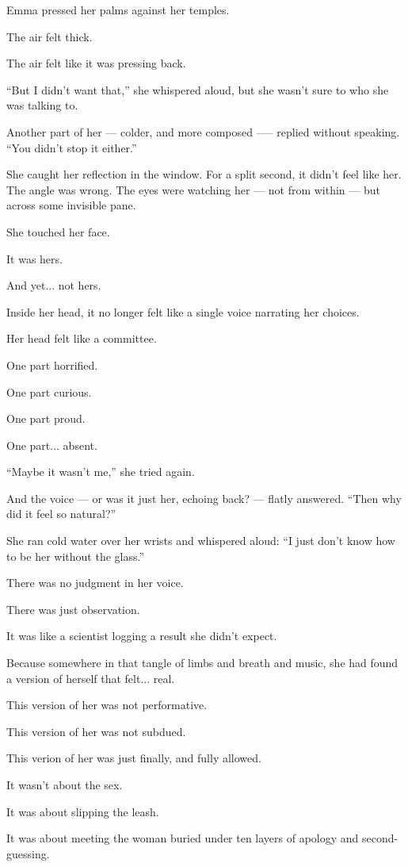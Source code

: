 Emma pressed her palms against her temples. 

The air felt thick. 

The air felt like it was pressing back.

``But I didn’t want that,'' she whispered aloud, but she wasn’t sure to who she was talking to.

Another part of her --- colder, and more composed —-- replied without speaking.
``You didn’t stop it either.''

She caught her reflection in the window. For a split second, it didn’t feel like her. The angle was 
wrong. The eyes were watching her --- not from within --- but across some invisible pane.

She touched her face. 

It was hers. 

And yet... not hers.

Inside her head, it no longer felt like a single voice narrating her choices. 

Her head felt like a committee. 

One part horrified. 

One part curious. 

One part proud.

One part... absent.

``Maybe it wasn’t me,'' she tried again.

And the voice --- or was it just her, echoing back? --- flatly answered.
``Then why did it feel so natural?''

She ran cold water over her wrists and whispered aloud:
``I just don’t know how to be her without the glass.''

There was no judgment in her voice. 

There was just observation. 

It was like a scientist logging a result she didn’t expect.

Because somewhere in that tangle of limbs and breath and music, she had found a version of herself that 
felt... real.

This version of her was not performative. 

This version of her was not subdued. 

This verion of her was just finally, and fully allowed.

It wasn’t about the sex.

It was about slipping the leash.

It was about meeting the woman buried under ten layers of apology and second-guessing.

